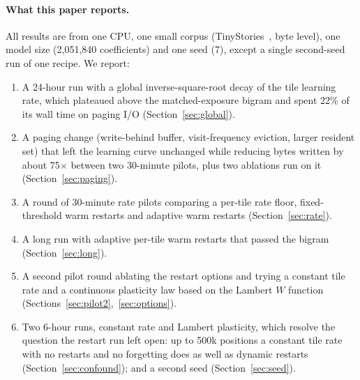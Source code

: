 \documentclass[10pt]{article}
\begin{document}
\paragraph{What this paper reports.}
All results are from one CPU, one small corpus (TinyStories~\citep{eldan2023tinystories},
byte level), one model size (2,051,840 coefficients) and one seed (7), except a single second-seed
run of one recipe. We report:
\begin{enumerate}[leftmargin=*,itemsep=2pt]
  \item A 24-hour run with a global inverse-square-root decay of the tile learning rate, which
  plateaued above the matched-exposure bigram and spent 22\% of its wall time on paging I/O
  (Section~\ref{sec:global}).
  \item A paging change (write-behind buffer, visit-frequency eviction, larger resident set) that
  left the learning curve unchanged while reducing bytes written by about 75$\times$ between
  two 30-minute pilots, plus two ablations run on it (Section~\ref{sec:paging}).
  \item A round of 30-minute rate pilots comparing a per-tile rate floor, fixed-threshold warm
  restarts and adaptive warm restarts (Section~\ref{sec:rate}).
  \item A long run with adaptive per-tile warm restarts that passed the bigram
  (Section~\ref{sec:long}).
  \item A second pilot round ablating the restart options and trying a constant tile rate and a
  continuous plasticity law based on the Lambert $W$ function (Sections~\ref{sec:pilot2},~\ref{sec:options}).
  \item Two 6-hour runs, constant rate and Lambert plasticity, which resolve the question the restart
  run left open: up to 500k positions a constant tile rate with no restarts and no forgetting does as
  well as dynamic restarts (Section~\ref{sec:confound}); and a second seed (Section~\ref{sec:seed}).
\end{enumerate}
\end{document}
